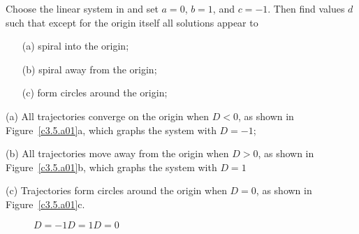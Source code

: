 \documentclass{ximera}
\begin{document}
\begin{exercise} \label{c3.5.a01}
Choose the {\sf linear system} in {\pplane} and set $a=0$, $b=1$, and 
$c=-1$.  Then find values $d$ such that except for the origin itself all 
solutions appear to
\begin{itemize}
\item[(a)] spiral into the origin;
\item[(b)] spiral away from the origin;
\item[(c)] form circles around the origin;
\end{itemize}

\begin{solution}

(a) All trajectories converge on the origin when $D < 0$, as shown in
Figure~\ref{c3.5.a01}a, which graphs the system with $D =- 1$;

(b) All trajectories move away from the origin when $D > 0$, as shown in
Figure~\ref{c3.5.a01}b, which graphs the system with $D = 1$

(c) Trajectories form circles around the origin when $D = 0$, as shown in
Figure~\ref{c3.5.a01}c.

\begin{figure}[htb]
                       \centerline{%
                       }
	\centerline{$D = -1$\hspace{1.4in}$D = 1$\hspace{1.4in}$D = 0$}
\end{figure}

\end{solution}
\end{exercise}
\end{document}
